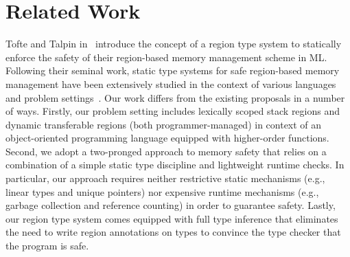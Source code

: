 \section{Related Work}
\label{sec:related-work}


Tofte and Talpin in~\cite{tofte93,tofte94,tofte97} introduce the
concept of a region type system to statically enforce the safety of
their region-based memory management scheme in ML. Following their
seminal work, static type systems for safe region-based memory
management have been extensively studied in the context of various
languages and problem settings~\cite{cyclone02, cyclone04, yates99,
MIT03, DPJ09, HMN01, WW01, rust, gpu14}. Our work differs from the
existing proposals in a number of ways. Firstly, our problem setting
includes lexically scoped stack regions and dynamic transferable
regions (both programmer-managed) in context of an object-oriented
programming language equipped with higher-order functions. Second, we
adopt a two-pronged approach to memory safety that relies on a
combination of a simple static type discipline and lightweight runtime
checks. 
In particular, our approach requires neither restrictive static
mechanisms (e.g., linear types and unique pointers) nor expensive
runtime mechanisms (e.g., garbage collection and reference counting)
in order to guarantee safety. Lastly, our region type system comes
equipped with full type inference that eliminates the need to write
region annotations on types to convince the type checker that the
program is safe. 

